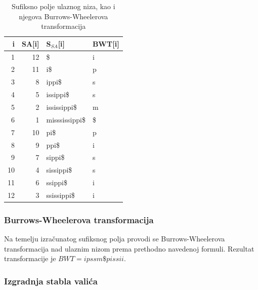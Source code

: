 \documentclass[a4paper,12pt]{article}
\begin{document}
\begin{enumerate}
	\begin{table}[h!]
		\caption{Sufiksno polje ulaznog niza, kao i njegova Burrows-Wheelerova transformacija}
		\label{tableEx2}
		\begin{center}
			\begin{tabular}{rrll}
				\toprule
				i & SA[i] & S$_{SA}$[i] & BWT[i] \\
				\midrule
				1 & 12 & \$ & i \\
				2 & 11 &  i\$ & p \\
				3 & 8 & ippi\$ & s \\
				4 & 5 & issippi\$ & s \\
				5 & 2 & ississippi\$ & m \\
				6 & 1 & misssissippi\$ & \$ \\
				7 & 10 & pi\$ & p \\
				8 & 9 & ppi\$ & i \\
				9 & 7 & sippi\$ & s \\
				10 & 4 & sissippi\$ & s \\
				11 & 6 & ssippi\$ & i \\
				12 & 3 & ssissippi\$ & i \\
				\bottomrule
			\end{tabular}
		\end{center}
	\end{table}
\end{enumerate}

\subsubsection{Burrows-Wheelerova transformacija}

Na temelju izračunatog sufiksnog polja provodi se Burrows-Wheelerova transformacija nad ulaznim nizom prema prethodno navedenoj formuli. Rezultat transformacije je $BWT = ipssm\$pissii$.

\subsubsection{Izgradnja stabla valića}
\end{document}
